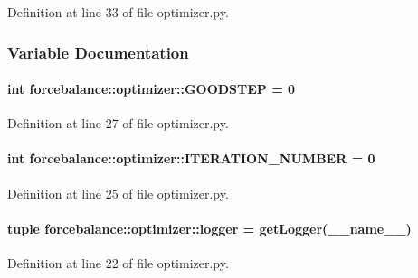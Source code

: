 \-Definition at line 33 of file optimizer.\-py.



\subsubsection{\-Variable \-Documentation}
\hypertarget{namespaceforcebalance_1_1optimizer_a638d98f2fea0c85ac05d0cf5f7efef84}{
\paragraph[{\-G\-O\-O\-D\-S\-T\-E\-P}]{\setlength{\rightskip}{0pt plus 5cm}int {\bf forcebalance\-::optimizer\-::\-G\-O\-O\-D\-S\-T\-E\-P} = 0}}\label{namespaceforcebalance_1_1optimizer_a638d98f2fea0c85ac05d0cf5f7efef84}


\-Definition at line 27 of file optimizer.\-py.

\hypertarget{namespaceforcebalance_1_1optimizer_a8b0e063c6ff704cbe779b65f400ff37e}{
\paragraph[{\-I\-T\-E\-R\-A\-T\-I\-O\-N\-\_\-\-N\-U\-M\-B\-E\-R}]{\setlength{\rightskip}{0pt plus 5cm}int {\bf forcebalance\-::optimizer\-::\-I\-T\-E\-R\-A\-T\-I\-O\-N\-\_\-\-N\-U\-M\-B\-E\-R} = 0}}\label{namespaceforcebalance_1_1optimizer_a8b0e063c6ff704cbe779b65f400ff37e}


\-Definition at line 25 of file optimizer.\-py.

\hypertarget{namespaceforcebalance_1_1optimizer_a3a90d52ff4e74cd917ce709e53b330df}{
\paragraph[{logger}]{\setlength{\rightskip}{0pt plus 5cm}tuple {\bf forcebalance\-::optimizer\-::logger} = get\-Logger(\-\_\-\-\_\-name\-\_\-\-\_\-)}}\label{namespaceforcebalance_1_1optimizer_a3a90d52ff4e74cd917ce709e53b330df}


\-Definition at line 22 of file optimizer.\-py.

